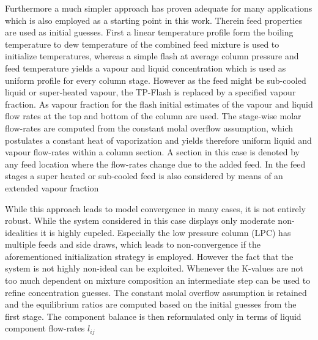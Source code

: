         Furthermore a much simpler approach has proven adequate for many applications \cite{Henley.op.2011}
        which is also employed as a starting point in this work.
        Therein feed properties are used as initial guesses. First a linear temperature profile form the boiling
        temperature to dew temperature of the combined feed mixture is used to initialize temperatures, whereas a simple flash
        at average column pressure and feed temperature yields a vapour and liquid concentration which is
        used as uniform profile for every column stage. However as the feed might be sub-cooled liquid or
        super-heated vapour, the TP-Flash is replaced by a specified vapour fraction. As vapour fraction
        for the flash initial estimates of the vapour and liquid flow rates at the top and bottom of the
        column are used. The stage-wise molar flow-rates are computed from the constant molal overflow
        assumption, which postulates a constant heat of vaporization and yields therefore uniform
        liquid and vapour flow-rates within a column section. A section in this case is denoted by any
        feed location where the flow-rates change due to the added feed. In the feed stages a super heated
        or sub-cooled feed is also considered by means of an extended vapour fraction

        While this approach leads to model convergence in many cases, it is not entirely robust.
        While the system considered in this case displays only moderate non-idealities it is highly cupeled.
        Especially the low pressure column (LPC) has multiple feeds and side draws, which leads to non-convergence
        if the aforementioned initialization strategy is employed. However the fact that the system is
        not highly non-ideal can be exploited. Whenever the K-values are not too much dependent on mixture
        composition an intermediate step can be used to refine concentration guesses. The constant molal
        overflow assumption is retained and the equilibrium ratios are computed based on the initial guesses
        from the first stage. The component balance is then reformulated only in terms of liquid component
        flow-rates $l_{ij}$


